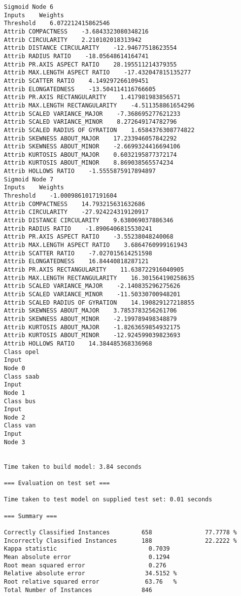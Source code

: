 \documentclass[
	article,			%
	11pt,				%
	oneside,			%
	a4paper,			%
	english,			%
	brazil,				%
	sumario=tradicional
	]{abntex2}
\begin{document}
\begin{lstlisting}
Sigmoid Node 6
Inputs    Weights
Threshold    6.072212415862546
Attrib COMPACTNESS    -3.6843323080348216
Attrib CIRCULARITY    2.210102018313942
Attrib DISTANCE CIRCULARITY    -12.94677518623554
Attrib RADIUS RATIO    -18.05648614164741
Attrib PR.AXIS ASPECT RATIO    28.195511214379355
Attrib MAX.LENGTH ASPECT RATIO    -17.432047815135277
Attrib SCATTER RATIO    4.149297266109451
Attrib ELONGATEDNESS    -13.504114116766605
Attrib PR.AXIS RECTANGULARITY    1.417981983856571
Attrib MAX.LENGTH RECTANGULARITY    -4.511358861654296
Attrib SCALED VARIANCE_MAJOR    -7.368695277621233
Attrib SCALED VARIANCE_MINOR    8.272649174782796
Attrib SCALED RADIUS OF GYRATION    1.6584376308774822
Attrib SKEWNESS ABOUT_MAJOR    17.233946057842292
Attrib SKEWNESS ABOUT_MINOR    -2.6699324416694106
Attrib KURTOSIS ABOUT_MAJOR    0.6032195877372174
Attrib KURTOSIS ABOUT_MINOR    8.869038565574234
Attrib HOLLOWS RATIO    -1.5555875917894897
Sigmoid Node 7
Inputs    Weights
Threshold    -1.0009861017191604
Attrib COMPACTNESS    14.793215631632686
Attrib CIRCULARITY    -27.924224319120917
Attrib DISTANCE CIRCULARITY    9.638069037886346
Attrib RADIUS RATIO    -1.8906406815530241
Attrib PR.AXIS ASPECT RATIO    -3.55238048240068
Attrib MAX.LENGTH ASPECT RATIO    3.6864760999161943
Attrib SCATTER RATIO    -7.027015614251598
Attrib ELONGATEDNESS    16.84440818287121
Attrib PR.AXIS RECTANGULARITY    11.638722916040905
Attrib MAX.LENGTH RECTANGULARITY    16.301564190258635
Attrib SCALED VARIANCE_MAJOR    -2.140835296275626
Attrib SCALED VARIANCE_MINOR    -11.50330700948201
Attrib SCALED RADIUS OF GYRATION    14.190829127218855
Attrib SKEWNESS ABOUT_MAJOR    3.7853783256261706
Attrib SKEWNESS ABOUT_MINOR    -2.199789498348879
Attrib KURTOSIS ABOUT_MAJOR    -1.8263659854932175
Attrib KURTOSIS ABOUT_MINOR    -12.924599039823693
Attrib HOLLOWS RATIO    14.384485368336968
Class opel
Input
Node 0
Class saab
Input
Node 1
Class bus
Input
Node 2
Class van
Input
Node 3


Time taken to build model: 3.84 seconds

=== Evaluation on test set ===

Time taken to test model on supplied test set: 0.01 seconds

=== Summary ===

Correctly Classified Instances         658               77.7778 %
Incorrectly Classified Instances       188               22.2222 %
Kappa statistic                          0.7039
Mean absolute error                      0.1294
Root mean squared error                  0.276 
Relative absolute error                 34.5152 %
Root relative squared error             63.76   %
Total Number of Instances              846     


\end{lstlisting}
\end{document}
